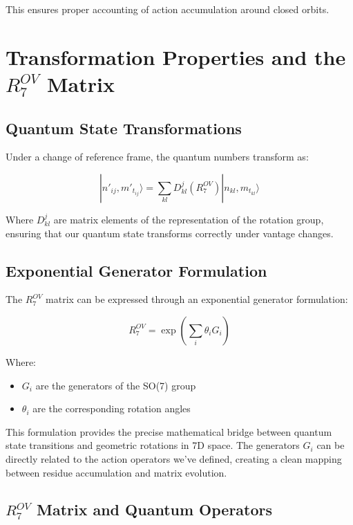 \documentclass{article}
\begin{document}
This ensures proper accounting of action accumulation around closed orbits.

\section{Transformation Properties and the $R^{OV}_7$ Matrix}

\subsection{Quantum State Transformations}
Under a change of reference frame, the quantum numbers transform as:

\begin{equation}
|n'_{ij}, m'_{t_{ij}}\rangle = \sum_{kl} D^j_{kl}(R^{OV}_7) |n_{kl}, m_{t_{kl}}\rangle
\end{equation}

Where $D^j_{kl}$ are matrix elements of the representation of the rotation group, ensuring that our quantum state transforms correctly under vantage changes.

\subsection{Exponential Generator Formulation}

The $R^{OV}_7$ matrix can be expressed through an exponential generator formulation:

\begin{equation}
R^{OV}_7 = \exp\left(\sum_i \theta_i G_i\right)
\end{equation}

Where:
\begin{itemize}
\item $G_i$ are the generators of the SO(7) group
\item $\theta_i$ are the corresponding rotation angles
\end{itemize}

This formulation provides the precise mathematical bridge between quantum state transitions and geometric rotations in 7D space. The generators $G_i$ can be directly related to the action operators we've defined, creating a clean mapping between residue accumulation and matrix evolution.

\subsection{$R^{OV}_7$ Matrix and Quantum Operators}
\end{document}
